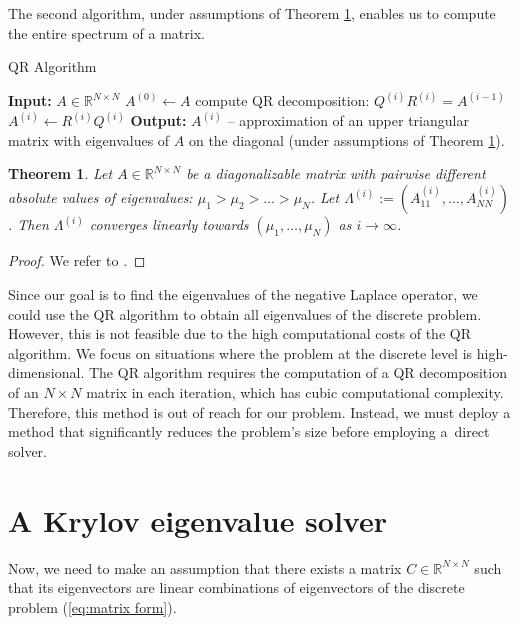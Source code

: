 \documentclass[a4paper,11pt,bibliography=totoc,listof=totoc,headinclude=true,cleardoublepage=empty,oneside]{scrbook}
\newtheorem{theorem}{Theorem}[chapter]
\newcommand{\R}{\mathbb{R}}
\renewcommand{\eqref}[1]{(\ref{#1})}
\begin{document}
The second algorithm, under assumptions of Theorem \ref{theorem:QR alg}, enables us to compute the entire spectrum of a matrix. 

\begin{algorithm}[H]
\caption{QR Algorithm}\label{alg:QR alg}
\begin{algorithmic}
    \State \textbf{Input:} $A \in \R^{N \times N}$
    \State $A^{(0)} \gets A$
        \State compute QR decomposition: $Q^{(i)} R^{(i)} = A^{(i-1)}$ 
        \State $A^{(i)} \gets R^{(i)}Q^{(i)}$
    \EndFor
    \State \textbf{Output:} $A^{(i)}$ -- approximation of an upper triangular matrix with eigenvalues of $A$ on the diagonal (under assumptions of Theorem \ref{theorem:QR alg}). 
    \end{algorithmic}
\end{algorithm}

\begin{theorem}\label{theorem:QR alg}
    Let $A \in \R^{N \times N}$ be a diagonalizable matrix with pairwise different absolute values of eigenvalues: $\mu_1 > \mu_2 > \dots > \mu_N$. Let $\Lambda^{(i)} := \left(A^{(i)}_{11}, \dots, A^{(i)}_{NN}\right)$. Then $\Lambda^{(i)}$ converges linearly towards $(\mu_1, \dots, \mu_N)$ as $i\rightarrow\infty$. 
\end{theorem}

\begin{proof}
    We refer to \cite[p. 120]{numericsAB}.
\end{proof}

Since our goal is to find the eigenvalues of the negative Laplace operator, we could use the QR algorithm to obtain all eigenvalues of the discrete problem. However, this is not feasible due to the high computational costs of the QR algorithm. We focus on situations where the problem at the discrete level is high-dimensional. The QR algorithm requires the computation of a QR decomposition of an $N \times N$ matrix in each iteration, which has cubic computational complexity. Therefore, this method is out of reach for our problem. Instead, we must deploy a method that significantly reduces the problem's size before employing a~direct solver. 

\section{A Krylov eigenvalue solver}

Now, we need to make an assumption that there exists a matrix $C\in \R^{N \times N}$ such that its eigenvectors are linear combinations of eigenvectors of the discrete problem \eqref{eq:matrix form}. 
\end{document}
